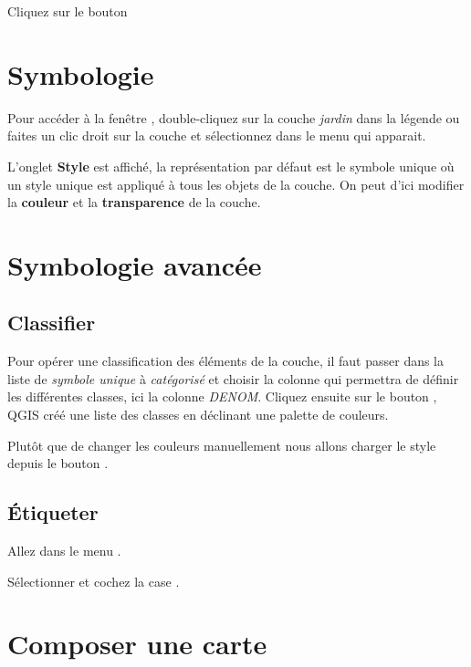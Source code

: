 Cliquez sur le bouton 

\section{Symbologie}

Pour accéder à la fenêtre , double-cliquez sur la couche \textit{jardin} dans la légende ou faites un clic droit sur la couche et sélectionnez  dans le menu qui apparait.

L'onglet \textbf{Style} est affiché, la représentation par défaut est le symbole unique où un style unique est appliqué à tous les objets de la couche. On peut d'ici modifier la \textbf{couleur} et la \textbf{transparence} de la couche.
        
\section{Symbologie avancée}

\subsection{Classifier}

Pour opérer une classification des éléments de la couche, il faut passer dans la liste de \textit{symbole unique} à \textit{catégorisé} et choisir la colonne qui permettra de définir les différentes classes, ici la colonne \textit{DENOM}. Cliquez ensuite sur le bouton , QGIS créé une liste des classes en déclinant une palette de couleurs.

Plutôt que de changer les couleurs manuellement nous allons charger le style  depuis le bouton .

\subsection{Étiqueter}

Allez dans le menu \arrow{}.

Sélectionner  et cochez la case .

\section{Composer une carte}

